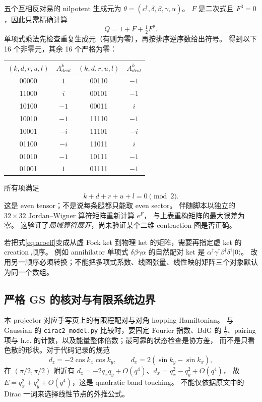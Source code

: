\documentclass[11pt]{article}
\newcommand{\code}[1]{\texttt{\small #1}}
\begin{document}
五个互相反对易的 nilpotent 生成元为
$\theta=(c^\dagger,\delta,\beta,\gamma,\alpha)$。
$F$ 是二次式且 $F^3=0$，因此只需精确计算
\begin{equation}
 Q=1+F+\tfrac12F^2.
\end{equation}
单项式乘法先检查重复生成元（有则为零），再按排序逆序数给出符号。
得到以下 16 个非零元，其余 16 个严格为零：
\begin{center}
\begin{tabular}{cc@{\qquad\qquad}cc}
\toprule
$(k,d,r,u,l)$ & $A^k_{drul}$ & $(k,d,r,u,l)$ & $A^k_{drul}$\\\midrule
00000 & $1$ & 00110 & $-1$\\
11000 & $i$ & 00101 & $-1$\\
10100 & $-1$ & 00011 & $i$\\
10010 & $-1$ & 11110 & $-1$\\
10001 & $-i$ & 11101 & $-i$\\
01100 & $-i$ & 11011 & $i$\\
01010 & $-1$ & 10111 & $-1$\\
01001 & $1$ & 01111 & $-1$\\\bottomrule
\end{tabular}
\end{center}
所有项满足
\begin{equation}
 k+d+r+u+l=0\pmod2.\label{eq:even}
\end{equation}
这是 even tensor；不是说每条腿都只能取 even sector。
伴随脚本以独立的 $32\times32$ Jordan--Wigner 算符矩阵重新计算 $e^F$，
与上表重构矩阵的最大误差为零。
这验证了\emph{局域算符展开}，尚未验证某个二维 contraction 图是否正确。

若把式\eqref{eq:acoeff}变成从虚 Fock ket 到物理 ket 的矩阵，需要再指定虚 ket 的 creation 顺序。
例如 annihilator 单项式 $\delta\beta\gamma\alpha$ 的自然配对 ket 是
$\alpha^\dagger\gamma^\dagger\beta^\dagger\delta^\dagger|0\rangle$。
改用另一顺序必须转换；不能把多项式系数、线图张量、线性映射矩阵三个对象默认为同一个数组。

\subsection{严格 GS 的核对与有限系统边界}

本 projector 对应手写页上的有限程配对与对角 hopping Hamiltonian。
与 Gaussian 的 \code{cirac2\_model.py} 比较时，要固定 Fourier 指数、BdG 的
$\tfrac12$、pairing 项与 h.c. 的计数，以及能量整体倍数；最可靠的状态检查是协方差，
而不是只看色散的形状。对于代码记录的规范
\begin{equation}
 d_z=-2\cos k_x\cos k_y,\qquad d_x=2(\sin k_y-\sin k_x),
\end{equation}
在 $(\pi/2,\pi/2)$ 附近有
$d_z=-2q_xq_y+O(q^4)$、$d_x=q_x^2-q_y^2+O(q^4)$，
故 $E=q_x^2+q_y^2+O(q^4)$，这是 quadratic band touching。
不能仅依据原文中的 Dirac 一词来选择线性节点的外推公式。
\end{document}
